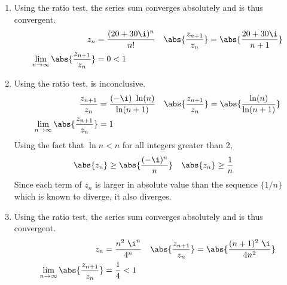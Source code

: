 \begin{enumerate}
    \item Using the ratio test, the series sum converges absolutely and is thus
          \textcolor{y_h}{convergent}.
          \begin{align}
              z_n                       & = \frac{(20 + 30\i)^n}{n!}    &
              \abs{\frac{z_{n+1}}{z_n}} & = \abs{\frac{20 + 30\i}{n+1}}   \\
              \lim_{n \to \infty}
              \abs{\frac{z_{n+1}}{z_n}} & = 0 < 1
          \end{align}

    \item Using the ratio test, is inconclusive.
          \begin{align}
              \frac{z_{n+1}}{z_n}       & = \frac{(-\i)\ \ln(n)}{\ln(n+1)} &
              \abs{\frac{z_{n+1}}{z_n}} & = \abs{\frac{\ln(n)}{\ln(n+1)}}    \\
              \lim_{n \to \infty}
              \abs{\frac{z_{n+1}}{z_n}} & = 1
          \end{align}
          Using the fact that $ \ln n < n $ for all integers greater than 2,
          \begin{align}
              \abs{z_n} & \geq \abs{\frac{(-\i)^n}{n}} &
              \abs{z_n} & \geq \frac{1}{n}
          \end{align}
          Since each term of $ z_n $ is larger in absolute value than the sequence
          $ \{1/n\} $ which is known to diverge, it also \textcolor{y_p}{diverges}.

    \item Using the ratio test, the series sum converges absolutely and is thus
          \textcolor{y_h}{convergent}.
          \begin{align}
              z_n                       & = \frac{n^2\ \i^n}{4^n}          &
              \abs{\frac{z_{n+1}}{z_n}} & = \abs{\frac{(n+1)^2\ \i}{4n^2}}   \\
              \lim_{n \to \infty}
              \abs{\frac{z_{n+1}}{z_n}} & = \frac{1}{4} < 1
          \end{align}


\end{enumerate}
